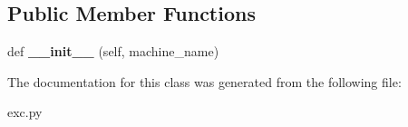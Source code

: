 \subsection*{Public Member Functions}
\begin{DoxyCompactItemize}
\item 
\mbox{\label{classcodar_1_1cheetah_1_1exc_1_1_machine_not_found_ae688c3fce79910a0bd7cd1e553be32cf}} 
def {\bfseries \+\_\+\+\_\+init\+\_\+\+\_\+} (self, machine\+\_\+name)
\end{DoxyCompactItemize}


The documentation for this class was generated from the following file\+:\begin{DoxyCompactItemize}
\item 
exc.\+py\end{DoxyCompactItemize}

